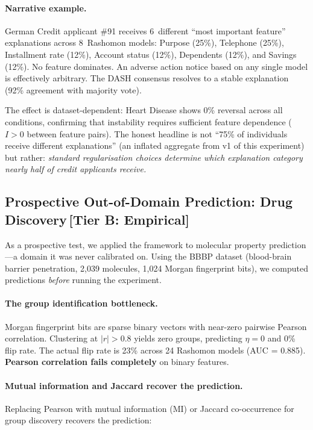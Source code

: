 \documentclass[11pt,a4paper]{article}
\begin{document}
\paragraph{Narrative example.}
German Credit applicant \#91 receives 6~different ``most important feature'' explanations across 8~Rashomon models: Purpose (25\%), Telephone (25\%), Installment rate (12\%), Account status (12\%), Dependents (12\%), and Savings (12\%). No feature dominates. An adverse action notice based on any single model is effectively arbitrary. The DASH consensus resolves to a stable explanation (92\% agreement with majority vote).

The effect is dataset-dependent: Heart Disease shows 0\% reversal across all conditions, confirming that instability requires sufficient feature dependence ($I > 0$ between feature pairs). The honest headline is not ``75\% of individuals receive different explanations'' (an inflated aggregate from v1 of this experiment) but rather: \emph{standard regularisation choices determine which explanation category nearly half of credit applicants receive.}

\subsection{Prospective Out-of-Domain Prediction: Drug Discovery\,\textnormal{\normalsize[Tier B: Empirical]}}
\label{sec:drug-discovery}

As a prospective test, we applied the framework to molecular property prediction---a domain it was never calibrated on. Using the BBBP dataset (blood-brain barrier penetration, 2{,}039 molecules, 1{,}024 Morgan fingerprint bits), we computed predictions \emph{before} running the experiment.

\paragraph{The group identification bottleneck.}
Morgan fingerprint bits are sparse binary vectors with near-zero pairwise Pearson correlation. Clustering at $|r| > 0.8$ yields zero groups, predicting $\eta = 0$ and 0\% flip rate. The actual flip rate is 23\% across 24 Rashomon models (AUC = 0.885). \textbf{Pearson correlation fails completely} on binary features.

\paragraph{Mutual information and Jaccard recover the prediction.}
Replacing Pearson with mutual information (MI) or Jaccard co-occurrence for group discovery recovers the prediction:
\end{document}
